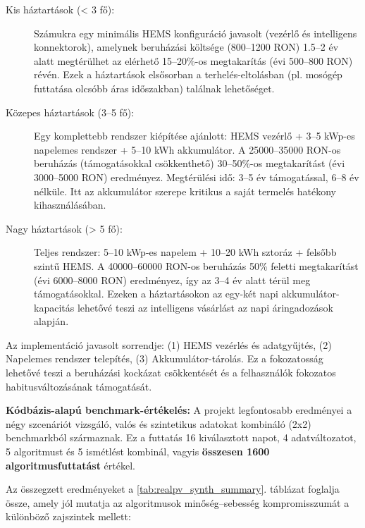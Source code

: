 \begin{description}
	\item[Kis háztartások (< 3 fő):] Számukra egy minimális HEMS konfiguráció javasolt (vezérlő és intelligens konnektorok), amelynek beruházási költsége (800--1200 RON) 1.5--2 év alatt megtérülhet az elérhető 15--20\%-os megtakarítás (évi 500--800 RON) révén. Ezek a háztartások elsősorban a terhelés-eltolásban (pl. mosógép futtatása olcsóbb áras időszakban) találnak lehetőséget.
	
	\item[Közepes háztartások (3--5 fő):] Egy komplettebb rendszer kiépítése ajánlott: HEMS vezérlő + 3--5 kWp-es napelemes rendszer + 5--10 kWh akkumulátor. A 25000--35000 RON-os beruházás (támogatásokkal csökkenthető) 30--50\%-os megtakarítást (évi 3000--5000 RON) eredményez. Megtérülési idő: 3--5 év támogatással, 6--8 év nélküle. Itt az akkumulátor szerepe kritikus a saját termelés hatékony kihasználásában.
	
	\item[Nagy háztartások (> 5 fő):] Teljes rendszer: 5--10 kWp-es napelem + 10--20 kWh sztoráz + felsőbb szintű HEMS. A 40000--60000 RON-os beruházás 50\% feletti megtakarítást (évi 6000--8000 RON) eredményez, így az 3--4 év alatt térül meg támogatásokkal. Ezeken a háztartásokon az egy-két napi akkumulátor-kapacitás lehetővé teszi az intelligens vásárlást az napi áringadozások alapján.
\end{description}

Az implementáció javasolt sorrendje: (1) HEMS vezérlés és adatgyűjtés, (2) Napelemes rendszer telepítés, (3) Akkumulátor-tárolás. Ez a fokozatosság lehetővé teszi a beruházási kockázat csökkentését és a felhasználók fokozatos habitusváltozásának támogatását.

\textbf{Kódbázis-alapú benchmark-értékelés:}
A projekt legfontosabb eredményei a négy szcenáriót vizsgáló, valós és szintetikus adatokat kombináló (2x2) benchmarkból származnak. Ez a futtatás 16 kiválasztott napot, 4 adatváltozatot, 5 algoritmust és 5 ismétlést kombinál, vagyis \textbf{összesen 1600 algoritmusfuttatást} értékel.

Az összegzett eredményeket a \ref{tab:realpv_synth_summary}. táblázat foglalja össze, amely jól mutatja az algoritmusok minőség--sebesség kompromisszumát a különböző zajszintek mellett:

